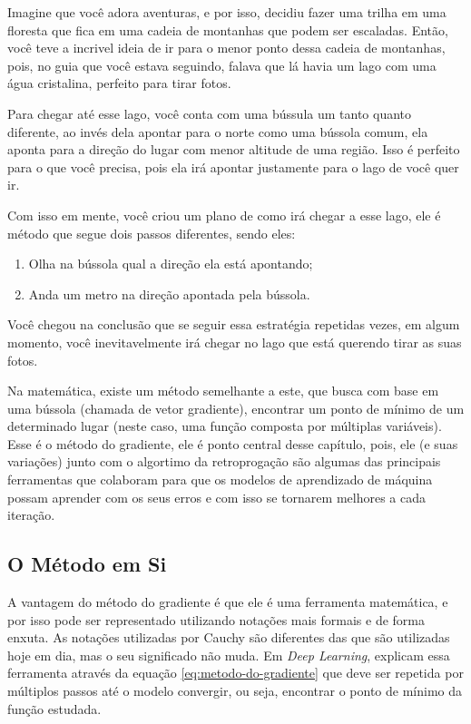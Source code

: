 Imagine que você adora aventuras, e por isso, decidiu fazer uma trilha em uma floresta que fica em uma cadeia de montanhas que podem ser escaladas. Então, você teve a incrivel ideia de ir para o menor ponto dessa cadeia de montanhas, pois, no guia que você estava seguindo, falava que lá havia um lago com uma água cristalina, perfeito para tirar fotos.

Para chegar até esse lago, você conta com uma bússula um tanto quanto diferente, ao invés dela apontar para o norte como uma bússola comum, ela aponta para a direção do lugar com menor altitude de uma região. Isso é perfeito para o que você precisa, pois ela irá apontar justamente para o lago de você quer ir.

Com isso em mente, você criou um plano de como irá chegar a esse lago, ele é método que segue dois passos diferentes, sendo eles:

\begin{enumerate}
    \item Olha na bússola qual a direção ela está apontando;
    \item Anda um metro na direção apontada pela bússola.
\end{enumerate}

Você chegou na conclusão que se seguir essa estratégia repetidas vezes, em algum momento, você inevitavelmente irá chegar no lago que está querendo tirar as suas fotos.

Na matemática, existe um método semelhante a este, que busca com base em uma bússola (chamada de vetor gradiente), encontrar um ponto de mínimo de um determinado lugar (neste caso, uma função composta por múltiplas variáveis). Esse é o método do gradiente, ele é ponto central desse capítulo, pois, ele (e suas variações) junto com o algortimo da retroprogação são algumas das principais ferramentas que colaboram para que os modelos de aprendizado de máquina possam aprender com os seus erros e com isso se tornarem melhores a cada iteração.

\subsection{O Método em Si}

A vantagem do método do gradiente é que ele é uma ferramenta matemática, e por isso pode ser representado utilizando notações mais formais e de forma enxuta. As notações utilizadas por Cauchy são diferentes das que são utilizadas hoje em dia, mas o seu significado não muda. Em \textit{Deep Learning}, \textcite{DeepLearningBook} explicam essa ferramenta através da equação \ref{eq:metodo-do-gradiente} que deve ser repetida por múltiplos passos até o modelo convergir, ou seja, encontrar o ponto de mínimo da função estudada.

